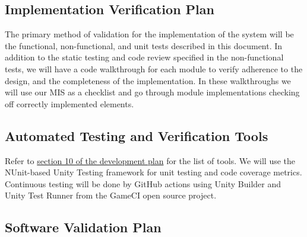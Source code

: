 \documentclass[12pt, titlepage]{article}
\begin{document}
\subsection{Implementation Verification Plan}




The primary method of validation for the implementation of the system will be the functional, non-functional, and unit tests described in this document. In addition to the static testing and code review specified in the non-functional tests, we will have a code walkthrough for each module to verify adherence to the design, and the completeness of the implementation. In these walkthroughs we will use our MIS as a checklist and go through module implementations checking off correctly implemented elements.

\subsection{Automated Testing and Verification Tools}

Refer to \href{https://github.com/russellrd/realm/blob/main/docs/DevelopmentPlan/DevelopmentPlan.pdf}{section 10 of the development plan} for the list of tools. We will use the NUnit-based Unity Testing framework for unit testing and code coverage metrics. Continuous testing will be done by GitHub actions using Unity Builder and Unity Test Runner from the GameCI open source project.

\subsection{Software Validation Plan}


\end{document}
